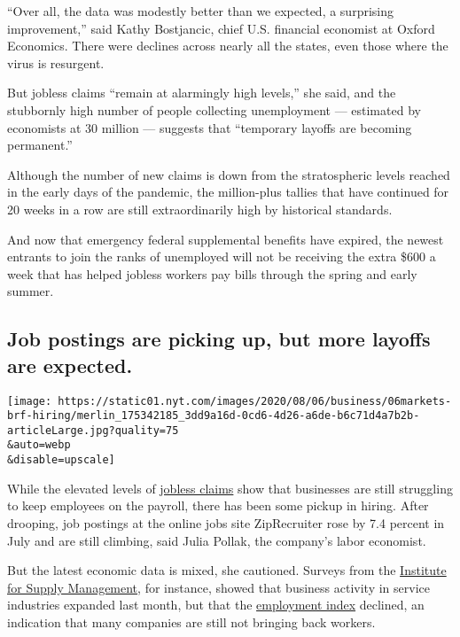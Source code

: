 ``Over all, the data was modestly better than we expected, a surprising
improvement,'' said Kathy Bostjancic, chief U.S. financial economist at
Oxford Economics. There were declines across nearly all the states, even
those where the virus is resurgent.

But jobless claims ``remain at alarmingly high levels,'' she said, and
the stubbornly high number of people collecting unemployment ---
estimated by economists at 30 million --- suggests that ``temporary
layoffs are becoming permanent.''

Although the number of new claims is down from the stratospheric levels
reached in the early days of the pandemic, the million-plus tallies that
have continued for 20 weeks in a row are still extraordinarily high by
historical standards.

And now that emergency federal supplemental benefits have expired, the
newest entrants to join the ranks of unemployed will not be receiving
the extra \$600 a week that has helped jobless workers pay bills through
the spring and early summer.

\hypertarget{job-postings-are-picking-up-but-more-layoffs-are-expected}{%
\subsection{Job postings are picking up, but more layoffs are
expected.}\label{job-postings-are-picking-up-but-more-layoffs-are-expected}}

\texttt{[image: https://static01.nyt.com/images/2020/08/06/business/06markets-brf-hiring/merlin\_175342185\_3dd9a16d-0cd6-4d26-a6de-b6c71d4a7b2b-articleLarge.jpg?quality=75\\\&auto=webp\\\&disable=upscale]}

While the elevated levels of
\href{https://www.nytimes.com/live/2020/08/06/business/stock-market-today-coronavirus\#new-state-jobless-claims-decline-but-exceed-one-million-for-the-20th-week}{jobless
claims} show that businesses are still struggling to keep employees on
the payroll, there has been some pickup in hiring. After drooping, job
postings at the online jobs site ZipRecruiter rose by 7.4 percent in
July and are still climbing, said Julia Pollak, the company's labor
economist.

But the latest economic data is mixed, she cautioned. Surveys from the
\href{https://www.ismworld.org/}{Institute for Supply Management}, for
instance, showed that business activity in service industries expanded
last month, but that the
\href{https://www.nytimes.com/live/2020/08/06/business/stock-market-today-coronavirus\#as-unemployment-benefits-began-to-run-out-a-freelance-job-came-just-in-time}{employment
index} declined, an indication that many companies are still not
bringing back workers.

